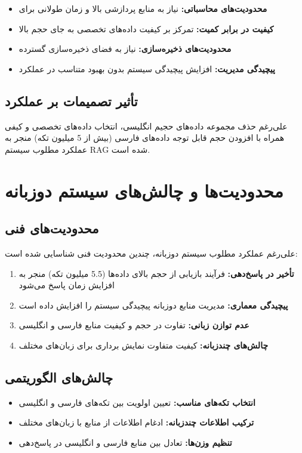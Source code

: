 \documentclass[11pt, a4paper, oneside]{book}
\begin{document}
	\begin{itemize}
		\item \textbf{محدودیت‌های محاسباتی:} نیاز به منابع پردازشی بالا و زمان طولانی برای 
		\item \textbf{کیفیت در برابر کمیت:} تمرکز بر کیفیت داده‌های تخصصی به جای حجم بالا
		\item \textbf{محدودیت‌های ذخیره‌سازی:} نیاز به فضای ذخیره‌سازی گسترده
		\item \textbf{پیچیدگی مدیریت:} افزایش پیچیدگی سیستم بدون بهبود متناسب در عملکرد
	\end{itemize}

	\subsection{تأثیر تصمیمات بر عملکرد}
	علی‌رغم حذف مجموعه داده‌های حجیم انگلیسی، انتخاب داده‌های تخصصی و کیفی همراه با افزودن حجم قابل توجه داده‌های فارسی (بیش از 5 میلیون تکه) منجر به عملکرد مطلوب سیستم RAG شده است.

	\section{محدودیت‌ها و چالش‌های سیستم دوزبانه}

	\subsection{محدودیت‌های فنی}
	علی‌رغم عملکرد مطلوب سیستم  دوزبانه، چندین محدودیت فنی شناسایی شده است:

	\begin{enumerate}
		\item \textbf{تأخیر در پاسخ‌دهی:} فرآیند بازیابی از حجم بالای داده‌ها (5.5 میلیون تکه) منجر به افزایش زمان پاسخ می‌شود
		\item \textbf{پیچیدگی معماری:} مدیریت منابع دوزبانه پیچیدگی سیستم را افزایش داده است
		\item \textbf{عدم توازن زبانی:} تفاوت در حجم و کیفیت منابع فارسی و انگلیسی
		\item \textbf{چالش‌های  چندزبانه:} کیفیت متفاوت نمایش برداری برای زبان‌های مختلف
	\end{enumerate}

	\subsection{چالش‌های الگوریتمی}
	\begin{itemize}
		\item \textbf{انتخاب تکه‌های مناسب:} تعیین اولویت بین تکه‌های فارسی و انگلیسی
		\item \textbf{ترکیب اطلاعات چندزبانه:} ادغام اطلاعات از منابع با زبان‌های مختلف
		\item \textbf{تنظیم وزن‌ها:} تعادل بین منابع فارسی و انگلیسی در پاسخ‌دهی
	\end{itemize}
\end{document}
